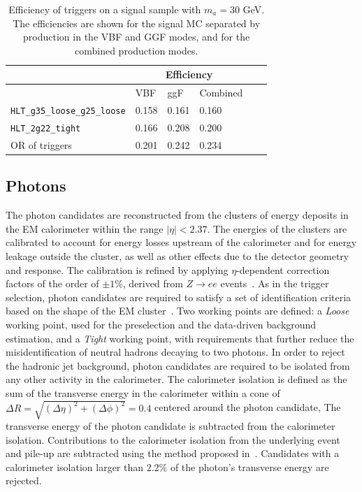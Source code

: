 \begin{table}[]
\centering
  \caption{Efficiency of triggers on a signal sample with $m_a=30$ GeV. The efficiencies are shown for the signal MC separated by production in the VBF and GGF modes, and for the combined production modes.}
\label{tab:HBSM:trigeff}
\begin{tabular}{|l|l|l|l|l|l|}
\hline
                                                      & \multicolumn{3}{c|}{Efficiency}  \\ \hline
                                                      & VBF      & ggF  & Combined   \\ \hline
\texttt{HLT\_g35\_loose\_g25\_loose}                  & 0.158  & 0.161 & 0.160\\ \hline
\texttt{HLT\_2g22\_tight}                             & 0.166  & 0.208 & 0.200\\ \hline
OR of triggers                                        & 0.201  & 0.242 & 0.234\\ \hline
\end{tabular}
\end{table}

\subsection{Photons}
\label{sec:HBSM:photons}
The photon candidates are reconstructed from the clusters of energy deposits in the EM calorimeter within the range $|\eta|<2.37$.
The energies of the clusters are calibrated to account for energy losses upstream of the calorimeter and for energy leakage outside the cluster, as well as other effects due to the detector geometry and response.
The calibration is refined by applying $\eta$-dependent correction factors of the order of $\pm1$\%, derived from $Z\to ee$ events~\cite{PERF-2013-05}.
As in the trigger selection, photon candidates are required to satisfy a set of identification criteria based on the shape of the EM cluster~\cite{PERF-2013-04}.
Two working points are defined: a \textit{Loose} working point, used for the preselection and the data-driven background estimation, and a 
\textit{Tight} working point, with requirements that further reduce the misidentification of neutral hadrons decaying to two photons.
In order to reject the hadronic jet background, photon candidates are required to be isolated from any other activity in the calorimeter.
The calorimeter isolation is defined as the sum of the transverse energy in the
calorimeter within a cone of \mbox{$\Delta R = \sqrt{(\Delta\eta)^2+(\Delta\phi)^2}=0.4$} centered around the photon candidate,
The transverse energy of the photon candidate is subtracted from the calorimeter isolation.
Contributions to the calorimeter isolation from the underlying event and pile-up are subtracted using the method proposed in~\cite{jetareas}.
Candidates with a calorimeter isolation larger than 2.2\% of the photon's transverse energy are rejected.


